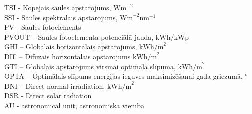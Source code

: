 \noindent TSI - Kopējais saules apstarojums, $\textrm{Wm}^{-2}$\\
SSI - Saules spektrālais apstarojums, $\textrm{Wm}^{-2}\textrm{nm}^{-1}$\\
PV - Saules fotoelements\\ %
PVOUT – Saules fotoelementa potenciālā jauda, $\textrm{kWh/kWp}$\\ %
GHI – Globālais horizontālais apstarojums,  $\textrm{kWh/m}^2$\\ %
DIF – Difūzais horizontālais apstarojums  $\textrm{kWh/m}^2$\\ %
GTI – Globālais apstarojums virsmai optimālā slīpumā, $\textrm{kWh/m}^2$\\ %
OPTA – Optimālais slīpums enerģijas ieguves maksimizēšanai gada griezumā, °\\ %
DNI – Direct normal irradiation, $\textrm{kWh/m}^2$\\ %
DSR - Direct solar radiation\\
AU - astronomical unit, astronomiskā vienība


